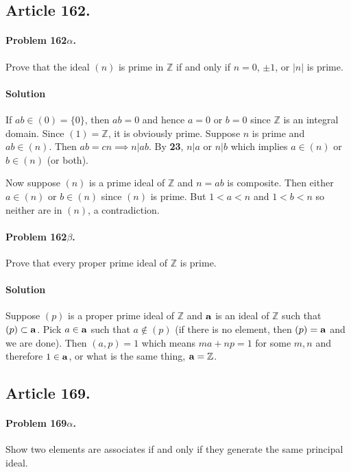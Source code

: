 \subsection{Article 162.}

\paragraph{Problem 162$\alpha$.}
Prove that the ideal $(n)$ is prime in $\mathbb{Z}$ if and only if $ n =
0$, $\pm 1$, or $|n|$ is prime.

\paragraph*{Solution}
If $ab \in (0) = \{0\}$, then $ab = 0$ and hence $a=0$ or $b=0$ since
$\mathbb{Z}$ is an integral domain. Since $(1) = \mathbb{Z}$, it is
obviously prime. Suppose $n$ is prime and $ab \in (n)$. Then $ab = cn
\implies n | ab$. By \textbf{23}, $n | a$ or $n | b$ which implies $a
\in (n)$ or $b \in (n)$ (or both).

Now suppose $(n)$ is a prime ideal of $\mathbb{Z}$ and $n = ab$ is
composite. Then either $a \in (n)$ or $b \in (n)$ since $(n)$ is
prime. But $1 < a < n$ and $1 < b < n$ so neither are in $(n)$, a
contradiction.

\paragraph{Problem 162$\beta$.}
Prove that every proper prime ideal of $\mathbb{Z}$ is prime.

\paragraph*{Solution}
Suppose $(p)$ is a proper prime ideal of $\mathbb{Z}$ and $\mathsf{\mathbf{a}}$
is an ideal of $\mathbb{Z}$ such that $(p) \subset \mathsf{\mathbf{a}}$. Pick $a
\in \mathsf{\mathbf{a}}$ such that $a \notin (p)$ (if there is no element, then
$(p) = \mathsf{\mathbf{a}}$ and we are done). Then $(a,p) = 1$ which means $ma +
np = 1$ for some $m, n$ and therefore $1 \in \mathsf{\mathbf{a}}$, or what is
the same thing, $\mathsf{\mathbf{a}} = \mathbb{Z}$.

\subsection{Article 169.}

\paragraph{Problem 169$\alpha$.}
Show two elements are associates if and only if they generate the same
principal ideal.


